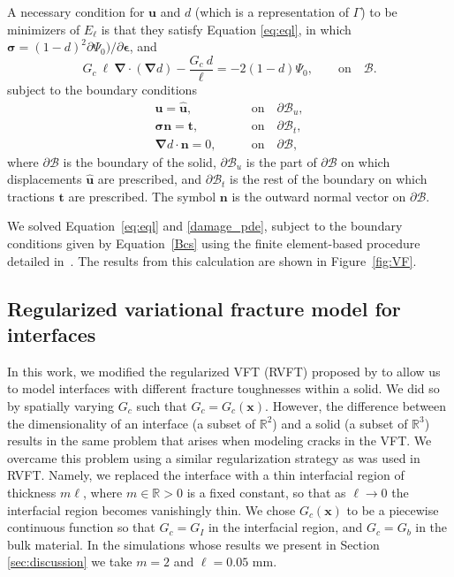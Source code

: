 \documentclass[12pt,onecolumn]{article}
\newcommand{\bs}[1]{\ensuremath{\mathbf{#1}}}
\begin{document}
\begin{bibunit}
A necessary condition for $\bs{u}$ and $d$ (which is a representation of $\Gamma$) to be  minimizers of $E_{\ell}$ is that they satisfy Equation \eqref{eq:eql}, in which  $\bm{\sigma}=(1-d)^2\partial\Psi_0)/\partial \bm{\epsilon}$, and 
%
\begin{equation}
	G_c ~\ell~ \bm{\nabla} \cdot \left(\bm{\nabla} d\right) -  \frac{G_c~ d}{\ell} = -2(1-d) \Psi_0,  \qquad \text{on} \quad \mathcal{B}. \label{damage_pde}
\end{equation} 
%
subject to the boundary conditions
%
\begin{subequations}\label{Bcs}
	\begin{align}
	\bs{u} = \hat{\bs{u}}, \qquad &\text{on} \quad \partial\mathcal{B}_u,\\
	\bm{\sigma} \bs{n} = \bs{t}, \qquad &\text{on} \quad \partial\mathcal{B}_t,\\
	\bm{\nabla} d \cdot \bs{n} = 0, \qquad &\text{on} \quad \partial\mathcal{B},
	\end{align}
\end{subequations}
%
where $\partial\mathcal{B}$ is the boundary of the solid, $\partial\mathcal{B}_u$ is the part of $\partial\mathcal{B}$ on which displacements $\hat{\bs{u}}$ are prescribed, and $\partial\mathcal{B}_t$ is the rest of the boundary on which tractions $\bs{t}$ are prescribed. The symbol $\bs{n}$ is the outward normal vector on $\partial\mathcal{B}$. 

We solved Equation~\eqref{eq:eql} and \eqref{damage_pde}, subject to the boundary conditions given by Equation~\eqref{Bcs} using the finite element-based procedure detailed in~\cite{miehe_2010}. The results from this calculation  are shown in Figure~\ref{fig:VF}.

\subsection{Regularized variational fracture model for interfaces}
In this work, we modified the regularized VFT (RVFT) proposed by \cite{bourdin2000numerical} to allow us to model interfaces with different fracture toughnesses within a solid. We did so by spatially varying $G_c$ such that $G_c = G_c(\bs{x})$. However, the difference between the dimensionality of an interface (a subset of $\mathbb{R}^2$) and a solid (a subset of $\mathbb{R}^3$) results in the same problem that arises when modeling cracks in the VFT. We overcame this problem using a similar regularization strategy as was used in RVFT. Namely, we replaced the interface with a thin interfacial region of thickness $m \ell$, where $m\in\mathbb{R}>0$ is a fixed constant, so that as $\ell \to 0$ the interfacial region becomes vanishingly thin. We chose $G_c(\bs{x})$ to be a piecewise continuous function so that $G_c = G_I$ in the interfacial region, and $G_c = G_b$ in the bulk material.  In the simulations whose results we present in Section \ref{sec:discussion} we take $m=2$ and $\ell=0.05$ mm.


\end{bibunit}
\end{document}

